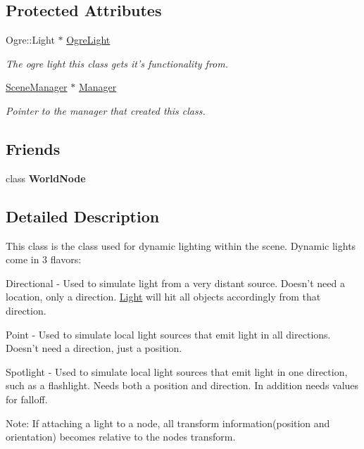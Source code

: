 \subsection*{Protected Attributes}
\begin{DoxyCompactItemize}
\item 
\hypertarget{classphys_1_1Light_a20fc9136847907955cfb8c1a47d6ec6a}{
Ogre::Light $\ast$ \hyperlink{classphys_1_1Light_a20fc9136847907955cfb8c1a47d6ec6a}{OgreLight}}
\label{dc/df1/classphys_1_1Light_a20fc9136847907955cfb8c1a47d6ec6a}

\begin{DoxyCompactList}\small\item\em The ogre light this class gets it's functionality from. \item\end{DoxyCompactList}\item 
\hypertarget{classphys_1_1Light_a2633fc1795d2a3e2ddddc71674a7eb84}{
\hyperlink{classphys_1_1SceneManager}{SceneManager} $\ast$ \hyperlink{classphys_1_1Light_a2633fc1795d2a3e2ddddc71674a7eb84}{Manager}}
\label{dc/df1/classphys_1_1Light_a2633fc1795d2a3e2ddddc71674a7eb84}

\begin{DoxyCompactList}\small\item\em Pointer to the manager that created this class. \item\end{DoxyCompactList}\end{DoxyCompactItemize}
\subsection*{Friends}
\begin{DoxyCompactItemize}
\item 
\hypertarget{classphys_1_1Light_a1cacd07efb11226da49a7c80569b18e8}{
class {\bfseries WorldNode}}
\label{dc/df1/classphys_1_1Light_a1cacd07efb11226da49a7c80569b18e8}

\end{DoxyCompactItemize}


\subsection{Detailed Description}
This class is the class used for dynamic lighting within the scene. Dynamic lights come in 3 flavors: \par
 Directional -\/ Used to simulate light from a very distant source. Doesn't need a location, only a direction. \hyperlink{classphys_1_1Light}{Light} will hit all objects accordingly from that direction. \par
 Point -\/ Used to simulate local light sources that emit light in all directions. Doesn't need a direction, just a position. \par
 Spotlight -\/ Used to simulate local light sources that emit light in one direction, such as a flashlight. Needs both a position and direction. In addition needs values for falloff. \par
 Note: If attaching a light to a node, all transform information(position and orientation) becomes relative to the nodes transform. 

